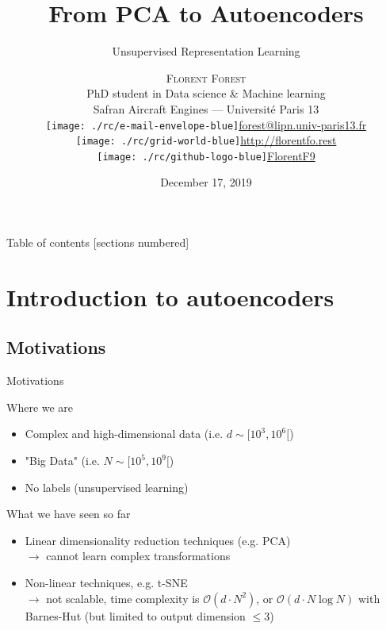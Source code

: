 \documentclass[handout]{beamer}
\title{From PCA to Autoencoders}
\subtitle{Unsupervised Representation Learning}
\date{December 17, 2019}
\author{\textsc{Florent Forest}\\
\scriptsize{PhD student in Data science \& Machine learning\\
Safran Aircraft Engines --- Université Paris 13}
\vspace{0.2cm}\\
\texttt{[image: ./rc/e-mail-envelope-blue]}\;\scriptsize{\href{mailto:forest@lipn.univ-paris13.fr}{forest@lipn.univ-paris13.fr}}\\
\texttt{[image: ./rc/grid-world-blue]}\;\scriptsize{\href{http://florentfo.rest}{http://florentfo.rest}}\\
\texttt{[image: ./rc/github-logo-blue]}\;\scriptsize{\href{https://github.com/FlorentF9}{FlorentF9}}\\
}
\institute{\vfill\hfill
\texttt{[image: ./rc/logo\_supaero]}}
\begin{document}
  \maketitle

  \begin{frame}{Table of contents}
    [sections numbered]
    \begin{small}
      \vspace{0.5cm}
      \tableofcontents%
    \end{small}
  \end{frame}

  \section{Introduction to autoencoders}

  \subsection{Motivations}

  \begin{frame}{Motivations}

    \begin{block}{Where we are}
      \begin{itemize}
        \item Complex and high-dimensional data (i.e. $d \sim [10^3, 10^6[$)
        \item "Big Data" (i.e. $N \sim [10^5, 10^9[$)
        \item No labels (unsupervised learning)
      \end{itemize}
    \end{block}
    \pause
    \begin{block}{What we have seen so far}
      \begin{itemize}
        \item Linear dimensionality reduction techniques (e.g. PCA)\\
        $\rightarrow$ cannot learn complex transformations
        \item Non-linear techniques, e.g. t-SNE\\
        $\rightarrow$ not scalable, time complexity is $\mathcal{O}(d \cdot N^2)$, or $\mathcal{O}(d \cdot N\log N)$ with Barnes-Hut (but limited to output dimension $\leq 3$)
      \end{itemize}
    \end{block}

  \end{frame}
\end{document}
